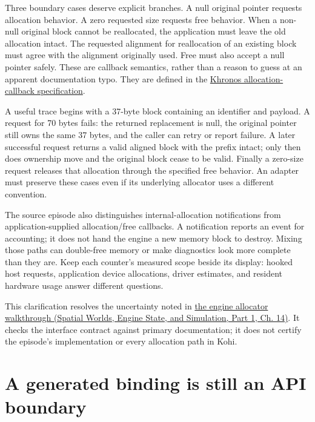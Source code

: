 Three boundary cases deserve explicit branches. A null original pointer requests allocation behavior. A zero requested size requests free behavior. When a non-null original block cannot be reallocated, the application must leave the old allocation intact. The requested alignment for reallocation of an existing block must agree with the alignment originally used. Free must also accept a null pointer safely. These are callback semantics, rather than a reason to guess at an apparent documentation typo. They are defined in the \href{https://docs.vulkan.org/spec/latest/chapters/memory.html}{Khronos allocation-callback specification}.

A useful trace begins with a 37-byte block containing an identifier and payload. A request for 70 bytes fails: the returned replacement is null, the original pointer still owns the same 37 bytes, and the caller can retry or report failure. A later successful request returns a valid aligned block with the prefix intact; only then does ownership move and the original block cease to be valid. Finally a zero-size request releases that allocation through the specified free behavior. An adapter must preserve these cases even if its underlying allocator uses a different convention.

The source episode also distinguishes internal-allocation notifications from application-supplied allocation/free callbacks. A notification reports an event for accounting; it does not hand the engine a new memory block to destroy. Mixing those paths can double-free memory or make diagnostics look more complete than they are. Keep each counter's measured scope beside its display: hooked host requests, application device allocations, driver estimates, and resident hardware usage answer different questions.

This clarification resolves the uncertainty noted in \href{../05-Spatial-Worlds-Engine-State-and-Simulation-P01/main.pdf\#05-engine-i-ch014-bridge-vulkan-allocation-callbacks-to-an-engine-allocator}{the engine allocator walkthrough (Spatial Worlds, Engine State, and Simulation, Part 1, Ch. 14)}. It checks the interface contract against primary documentation; it does not certify the episode's implementation or every allocation path in Kohi.

\section{A generated binding is still an API boundary}\label{01-foundations-i-ch016-a-generated-binding-is-still-an-api-boundary}

